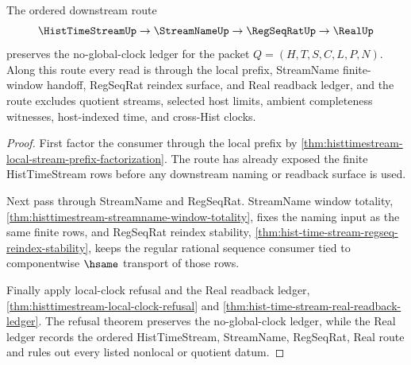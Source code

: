 \begin{theorem}
\label{thm:histtimestream-streamname-real-consumer-route}
The ordered downstream route
$$
\HistTimeStreamUp \to \StreamNameUp \to \RegSeqRatUp \to \RealUp
$$
preserves the no-global-clock ledger for the packet $Q=(H,T,S,C,L,P,N)$. Along this route every read is through the local prefix, StreamName finite-window handoff, RegSeqRat reindex surface, and Real readback ledger, and the route excludes quotient streams, selected host limits, ambient completeness witnesses, host-indexed time, and cross-Hist clocks.
\end{theorem}
\begin{proof}
First factor the consumer through the local prefix by \autoref{thm:histtimestream-local-stream-prefix-factorization}. The route has already exposed the finite HistTimeStream rows before any downstream naming or readback surface is used.

Next pass through StreamName and RegSeqRat. StreamName window totality, \autoref{thm:histtimestream-streamname-window-totality}, fixes the naming input as the same finite rows, and RegSeqRat reindex stability, \autoref{thm:hist-time-stream-regseq-reindex-stability}, keeps the regular rational sequence consumer tied to componentwise $\hsame$ transport of those rows.

Finally apply local-clock refusal and the Real readback ledger, \autoref{thm:histtimestream-local-clock-refusal} and \autoref{thm:hist-time-stream-real-readback-ledger}. The refusal theorem preserves the no-global-clock ledger, while the Real ledger records the ordered HistTimeStream, StreamName, RegSeqRat, Real route and rules out every listed nonlocal or quotient datum.
\end{proof}

